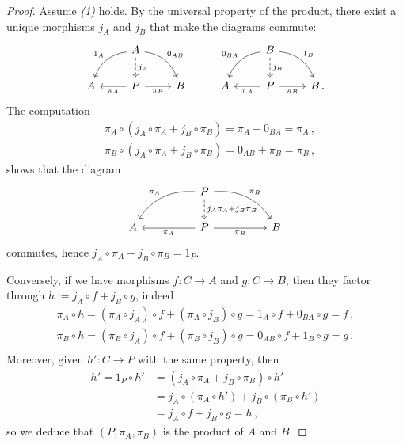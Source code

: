 \begin{prop}
\begin{proof}
        Assume \emph{(1)} holds. By the universal property of the
        product, there exist a unique morphisms $j_{A}$ and $j_{B}$ that
        make the diagrams commute:
        \begin{equation*}
            \begin{tikzcd}
                    & A \ar[d,"j_{A}", dashed] \ar[dr, "0_{AB}", bend left] \ar[dl, "1_{A}"', bend right] & 
                    & & B \ar[d,"j_{B}", dashed] \ar[dr, "1_{B}", bend left] \ar[dl,"0_{BA}"', bend right] &  \\
                    A & P \ar[l, "\pi_{A}"] \ar[r, "\pi_{B}"'] & B 
                    &  A & P \ar[l, "\pi_{A}"] \ar[r, "\pi_{B}"'] & B\,.
            \end{tikzcd}
        \end{equation*}
        The computation
        \begin{align*}
            &\pi_{A} \circ (j_{A} \circ \pi_{A} + j_{B} \circ \pi_{B}) = \pi_{A} + 0_{BA} = \pi_{A}\,, \\
            & \pi_{B} \circ (j_{A} \circ \pi_{A} + j_{B} \circ \pi_{B}) = 0_{AB} + \pi_{B} = \pi_{B}\,,
        \end{align*}
        shows that the diagram
        \begin{equation*}
            \begin{tikzcd}
                    & &P \ar[d,"j_{A}\pi_{A} + j_{B}\pi_{B}", dashed] \ar[drr, "\pi_{B}", bend left] \ar[dll, "\pi_{A}"', bend right] & &\\
                    A & & P \ar[ll, "\pi_{A}"] \ar[rr, "\pi_{B}"'] & &  B \,
            \end{tikzcd}
        \end{equation*}
        commutes, hence $j_{A} \circ \pi_{A} + j_{B} \circ \pi_{B} = 1_{P}$.
        
        Conversely, if we have morphisms $f:C \to A$ and $g: C \to B$, 
        then they factor through $h := j_{A} \circ f + j_{B} \circ g$, indeed
        \begin{align*}
            \pi_{A} \circ h 
            = (\pi_{A} \circ j_{A}) \circ f + (\pi_{A} \circ j_{B}) \circ g
            = 1_{A} \circ f + 0_{BA} \circ g = f\,,\\
            \pi_{B} \circ h 
            = (\pi_{B} \circ j_{A}) \circ f + (\pi_{B} \circ j_{B}) \circ g
            = 0_{AB} \circ f + 1_{B} \circ g = g\,.\\
        \end{align*}
        Moreover, given $h':C \to P$ with the same property, then
        \begin{align*}
            h' = 1_{P} \circ h' &= (j_{A} \circ \pi_{A} + j_{B} \circ \pi_{B}) \circ h'\\
            &= j_{A} \circ (\pi_{A} \circ h') + j_{B} \circ (\pi_{B} \circ h')\\
            &= j_{A} \circ f + j_{B} \circ g = h\,,
        \end{align*}
        so we deduce that $(P,\pi_{A},\pi_{B})$ is the product of $A$ and $B$.
    \end{proof}
\end{prop}

